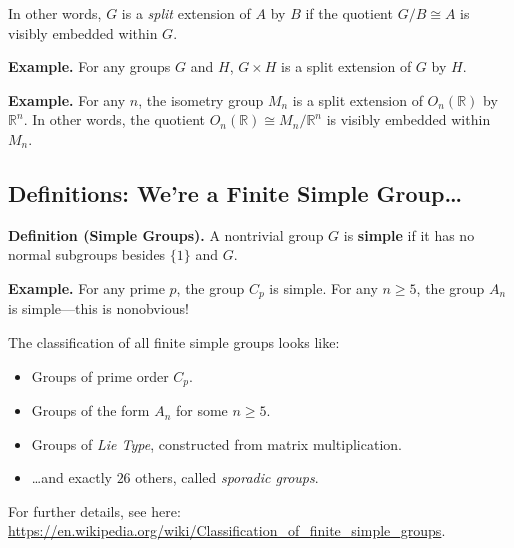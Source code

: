 In other words, $G$ is a \emph{split} extension of $A$ by $B$ if the quotient $G / B \cong A$ is visibly embedded within $G$.

\textbf{Example.} For any groups $G$ and $H$, $G \times H$ is a split extension of $G$ by $H$.

\textbf{Example.} For any $n$, the isometry group $M_n$ is a split extension of $O_n(\mathbb{R})$ by $\mathbb{R}^n$.  In other words, the quotient $O_n(\mathbb{R}) \cong M_n / \mathbb{R}^n$ is visibly embedded within $M_n$.



\subsection{Definitions: We're a Finite Simple Group\dots}

\textbf{Definition (Simple Groups).} A nontrivial group $G$ is \textbf{simple} if it has no normal subgroups besides $\{1\}$ and $G$.

\textbf{Example.} For any prime $p$, the group $C_p$ is simple.  For any $n \geq 5$, the group $A_n$ is simple---this is nonobvious!

The classification of all finite simple groups looks like:
    \begin{itemize}
        \item Groups of prime order $C_p$.
        \item Groups of the form $A_n$ for some $n \geq 5$.
        \item Groups of \emph{Lie Type}, constructed from matrix multiplication.
        \item \dots and exactly $26$ others, called \emph{sporadic groups}.
    \end{itemize}
For further details, see here: \href{https://en.wikipedia.org/wiki/Classification_of_finite_simple_groups}{https://en.wikipedia.org/wiki/Classification\_of\_finite\_simple\_groups}.

